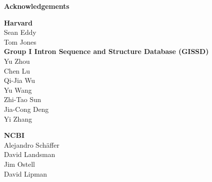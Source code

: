 \documentclass[landscape]{slides}
\begin{document}
\begin{slide}

\large
\begin{center}
\large{\textbf{Acknowledgements}} \\

\normalsize
\vspace{0.5in}

\textbf{Harvard} \\
Sean Eddy \\
Tom Jones \\

\vspace{0.5in}
\textbf{Group I Intron Sequence and Structure Database (GISSD)} \\
Yu Zhou \\
Chen Lu \\
Qi-Jia Wu \\
Yu Wang \\
Zhi-Tao Sun \\
Jia-Cong Deng \\
Yi Zhang \\

\vspace{0.5in}

\textbf{NCBI} \\
Alejandro Sch\"{a}ffer \\
David Landsman \\
Jim Ostell \\
David Lipman \\


\end{center}

\vfill
\end{slide}
\end{document}
